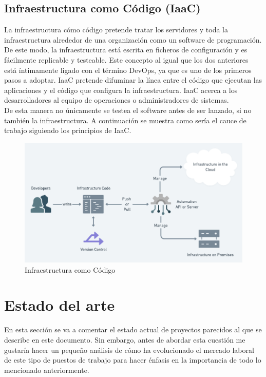	\subsection{Infraestructura como Código (IaaC)}
		\begin{paragraph}
			La infraestructura cómo código pretende tratar los servidores y toda la infraestructura alrededor de una organización como un software de programación. De este modo, la infraestructura está escrita en ficheros de configuración y es fácilmente replicable y testeable. Este concepto al igual que los dos anteriores está íntimamente ligado con el término DevOps, ya que es uno de los primeros pasos a adoptar. IaaC pretende difuminar la línea entre el código que ejecutan las aplicaciones y el código que configura la infraestructura. IaaC acerca a los desarrolladores al equipo de operaciones o administradores de sistemas. \\
			De esta manera no únicamente se testea el software antes de ser lanzado, si no también la infraestructura. A continuación se muestra como sería el cauce de trabajo siguiendo los principios de IaaC.
			
			\begin{figure}[!hbt]
				\centering
				\includegraphics[scale=0.45]{imagenes/Introduccion/Conceptos_Basicos/IaaC.png}
				\caption[Infraestructura como Código]{Infraestructura como Código \cite{WhatIsIaaC:online}}
				\label{infraestructura_como_codigo} 
			\end{figure}
		\end{paragraph}
	
\section{Estado del arte}
	\begin{paragraph}
		En esta sección se va a comentar el estado actual de proyectos parecidos al que se describe en este documento. Sin embargo, antes de abordar esta cuestión me gustaría hacer un pequeño análisis de cómo ha evolucionado el mercado laboral de este tipo de puestos de trabajo para hacer énfasis en la importancia de todo lo mencionado anteriormente.
	\end{paragraph}


